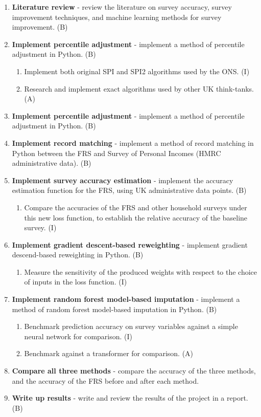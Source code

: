 \documentclass[twocolumn]{article}
\begin{document}
\begin{enumerate}
    \item \textbf{Literature review} - review the literature on survey accuracy, survey improvement techniques, and machine learning methods for survey improvement. (B)
    \item \textbf{Implement percentile adjustment} - implement a method of percentile adjustment in Python. (B)
    \begin{enumerate}
        \item Implement both original SPI and SPI2 algorithms used by the ONS. (I)
        \item Research and implement exact algorithms used by other UK think-tanks. (A)
    \end{enumerate}
    \item \textbf{Implement percentile adjustment} - implement a method of percentile adjustment in Python. (B)
    \item \textbf{Implement record matching} - implement a method of record matching in Python between the FRS and Survey of Personal Incomes (HMRC administrative data). (B)
    \item \textbf{Implement survey accuracy estimation} - implement the accuracy estimation function for the FRS, using UK administrative data points. (B)
    \begin{enumerate}
        \item Compare the accuracies of the FRS and other household surveys under this new loss function, to establish the relative accuracy of the baseline survey. (I)
    \end{enumerate}
    \item \textbf{Implement gradient descent-based reweighting} - implement gradient descend-based reweighting in Python. (B)
    \begin{enumerate}
        \item Measure the sensitivity of the produced weights with respect to the choice of inputs in the loss function. (I)
    \end{enumerate}
    \item \textbf{Implement random forest model-based imputation} - implement a method of random forest model-based imputation in Python. (B)
    \begin{enumerate}
        \item Benchmark prediction accuracy on survey variables against a simple neural network for comparison. (I)
        \item Benchmark against a transformer for comparison. (A)
    \end{enumerate}
    \item \textbf{Compare all three methods} - compare the accuracy of the three methods, and the accuracy of the FRS before and after each method.
    \item \textbf{Write up results} - write and review the results of the project in a report. (B)
\end{enumerate}
\end{document}
